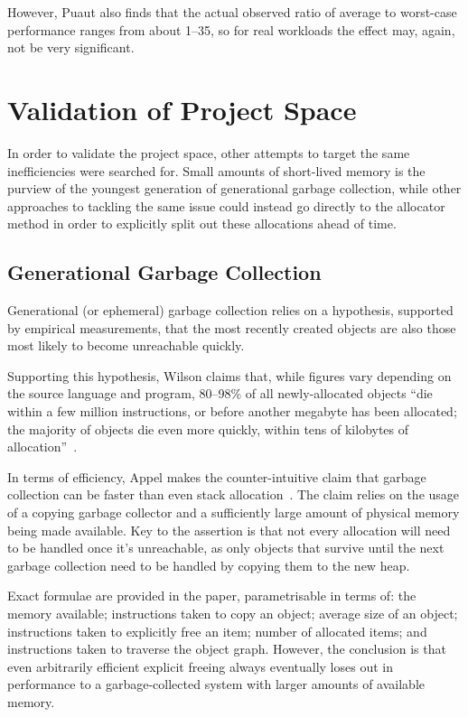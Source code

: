 However, Puaut also finds that the actual observed ratio of average to worst-case performance ranges from about 1–35, so for real workloads the effect may, again, not be very significant.

\section{Validation of Project Space}

In order to validate the project space, other attempts to target the same inefficiencies were searched for. Small amounts of short-lived memory is the purview of the youngest generation of generational garbage collection, while other approaches to tackling the same issue could instead go directly to the allocator method in order to explicitly split out these allocations ahead of time.

\subsection{Generational Garbage Collection}

Generational (or ephemeral) garbage collection relies on a hypothesis, supported by empirical measurements, that the most recently created objects are also those most likely to become unreachable quickly.

Supporting this hypothesis, Wilson claims that, while figures vary depending on the source language and program, 80–98\% of all newly-allocated objects ``die within a few million instructions, or before another megabyte has been allocated; the majority of objects die even more quickly, within tens of kilobytes of allocation''~\cite{uniprocessorgc}.

In terms of efficiency, Appel makes the counter-intuitive claim that garbage collection can be faster than even stack allocation~\cite{stackvgc}. The claim relies on the usage of a copying garbage collector and a sufficiently large amount of physical memory being made available. Key to the assertion is that not every allocation will need to be handled once it's unreachable, as only objects that survive until the next garbage collection need to be handled by copying them to the new heap.

Exact formulae are provided in the paper, parametrisable in terms of: the memory available; instructions taken to copy an object; average size of an object; instructions taken to explicitly free an item; number of allocated items; and instructions taken to traverse the object graph. However, the conclusion is that even arbitrarily efficient explicit freeing always eventually loses out in performance to a garbage-collected system with larger amounts of available memory.

